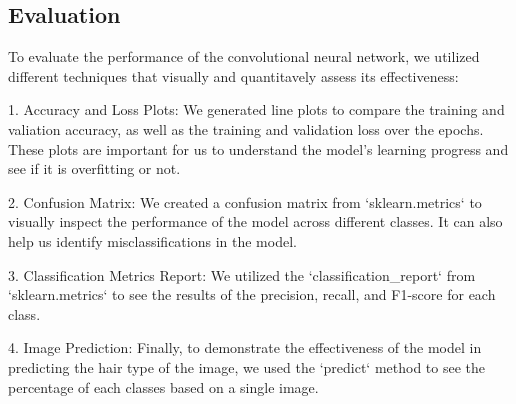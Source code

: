\subsection{Evaluation}

To evaluate the performance of the convolutional neural network, we utilized different techniques that visually and quantitavely assess its effectiveness:

1. Accuracy and Loss Plots: We generated line plots to compare the training and valiation accuracy, as well as the training and validation loss over the epochs. These plots are important for us to understand the model's learning progress and see if it is overfitting or not.

2. Confusion Matrix: We created a confusion matrix from `sklearn.metrics` to visually inspect the performance of the model across different classes. It can also help us identify misclassifications in the model.

3. Classification Metrics Report: We utilized the `classification_report` from `sklearn.metrics` to see the results of the precision, recall, and F1-score for each class. 

4. Image Prediction: Finally, to demonstrate the effectiveness of the model in predicting the hair type of the image, we used the `predict` method to see the percentage of each classes based on a single image.